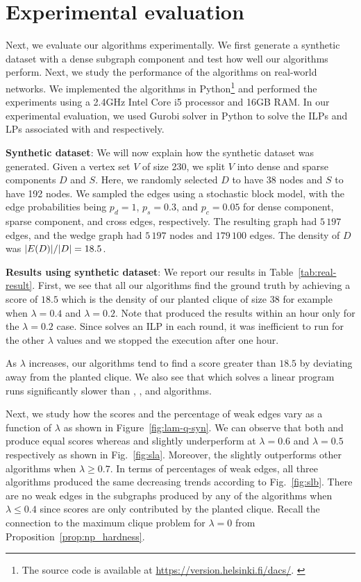 \section{Experimental evaluation}\label{sec:exp}




Next, we evaluate our
algorithms experimentally. We first generate a synthetic dataset with a dense subgraph component and test how well our algorithms perform.
Next, we study the performance of the algorithms on real-world networks.
We implemented the algorithms in Python\footnote{The source code is available at \url{https://version.helsinki.fi/dacs/}.
\label{foot:code}} and performed the experiments using a 2.4GHz Intel Core i5 processor and 16GB RAM. In our experimental evaluation, we used Gurobi solver in Python to solve the ILPs and LPs associated with \algip and \alglpstc respectively.

\textbf{Synthetic dataset}:
We will now explain how the synthetic dataset was generated.
Given a vertex set $V$ of size 230, we split $V$ into dense and sparse components $D$ and $S$. Here, we randomly selected $D$ to have 38 nodes and $S$ to have 192 nodes.
We sampled the edges using a stochastic block model, with the edge probabilities
being $p_d = 1$, $p_s = 0.3$, and $p_c = 0.05$ for dense component, sparse component, and cross edges, respectively. 
The resulting graph had $5\,197$ edges, and the wedge graph had $5\,197$ nodes and $179\,100$ edges. The density of $D$ was ${\left|E(D)\right|} / {\left|D\right|} = 18.5$.


\textbf{Results using synthetic dataset}:
We report our results in Table~\ref{tab:real-result}. First, we see that all our algorithms find the ground truth by achieving a score of $18.5$ which is the density of our planted clique of size $38$ for example when $\lambda = 0.4$ and $\lambda = 0.2$. Note that \algip produced the results within an hour only for the $\lambda = 0.2$ case. Since \algip solves an ILP in each round, it was inefficient to run for the other $\lambda$ values and we stopped the execution after one hour.

As $\lambda$ increases, our algorithms tend to find a score greater than $18.5$ by deviating away from the planted clique. We also see that \alglpstc which solves a linear program runs significantly slower than \alggreedyfastest, \algdensec, and \algdenseg algorithms. 

Next, we study how the scores and the percentage of weak edges vary as a function of $\lambda$ as shown in Figure~\ref{fig:lam-q-syn}. We can observe that both \algdenseg and \algdensec produce equal scores whereas \algdensec and \alglpstc slightly underperform at $\lambda = 0.6$ and $\lambda = 0.5$ respectively as shown in Fig.~\ref{fig:sla}. Moreover, the \alglpstc slightly outperforms other algorithms when $\lambda \geq 0.7$. In terms of percentages of weak edges, all three algorithms produced the same decreasing trends according to Fig.~\ref{fig:slb}. 
There are no weak edges in the subgraphs produced by any of the algorithms when $\lambda \leq 0.4$ since scores are only contributed by the planted clique. Recall the connection to the maximum clique problem for $\lambda=0$ from Proposition~\ref{prop:np_hardness}.

